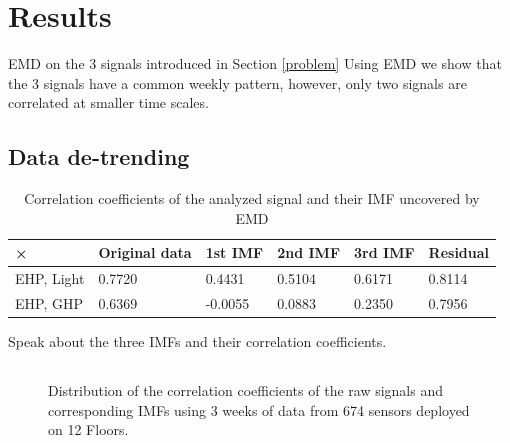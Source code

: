 \section{Results}
EMD on the 3 signals introduced in Section \ref{problem}
Using EMD we show that the 3 signals have a common weekly pattern, however, only two signals are correlated at smaller time scales.

\subsection{Data de-trending}
\begin{table}
\begin{center}
\begin{tabular}{|l|l|l|l|l|l|}
\hline
× & Original data & 1st IMF & 2nd IMF & 3rd IMF & Residual\\ \hline
EHP, Light & 0.7720 & 0.4431 & 0.5104 & 0.6171 & 0.8114\\ \hline
EHP, GHP & 0.6369 & -0.0055 & 0.0883 & 0.2350 & 0.7956\\ \hline
\end{tabular}

\caption{Correlation coefficients of the analyzed signal and their IMF uncovered by EMD}

\end{center}
\end{table}

Speak about the three IMFs and their correlation coefficients.



\subsection{}
\begin{figure}
\centering
 \caption{Distribution of the correlation coefficients of the raw signals and corresponding IMFs using 3 weeks of data from 674 sensors deployed on 12 Floors.}
\end{figure}


